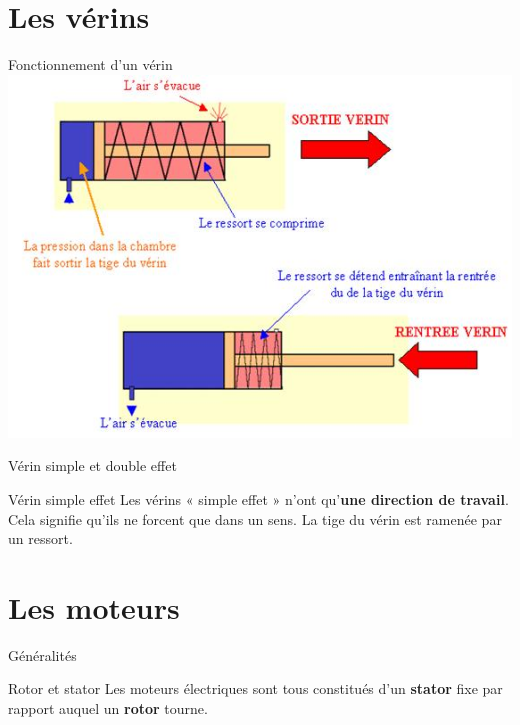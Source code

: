 \documentclass{beamer}
\begin{document}
\section{Les vérins}

\begin{frame}{Fonctionnement d'un vérin}
  \includegraphics[width=.5\textwidth]{images/verin}
\end{frame}

\begin{frame}{Vérin simple et double effet}
  \begin{block}{Vérin simple effet}
    Les vérins « simple effet » n'ont qu'\textbf{une direction de travail}. Cela signifie qu'ils ne forcent que dans un sens. La tige du vérin est ramenée par un ressort.
  \end{block}
\end{frame}

\section{Les moteurs}

\begin{frame}{Généralités}
  \begin{alertblock}{Rotor et stator}
    Les moteurs électriques sont tous constitués d'un \textbf{stator} fixe par rapport auquel un \textbf{rotor} tourne.
  \end{alertblock}

  \centering
\end{frame}
\end{document}
